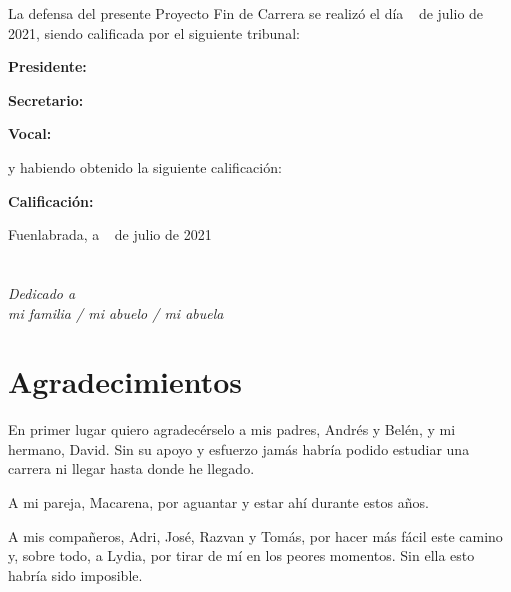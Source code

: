 \documentclass[a4paper, 12pt]{book}
\begin{document}
\vspace{1cm}
La defensa del presente Proyecto Fin de Carrera se realizó el día \qquad$\;\,$ de julio de 2021, siendo calificada por el siguiente tribunal:


\vspace{0.5cm}
\textbf{Presidente:}

\vspace{1.2cm}
\textbf{Secretario:}

\vspace{1.2cm}
\textbf{Vocal:}


\vspace{1.2cm}
y habiendo obtenido la siguiente calificación:

\vspace{1cm}
\textbf{Calificación:}


\vspace{1cm}
\begin{flushright}
Fuenlabrada, a \qquad$\;\,$ de julio de 2021
\end{flushright}


\chapter*{}
\begin{flushright}
\textit{Dedicado a \\
mi familia / mi abuelo / mi abuela}
\end{flushright}


\chapter*{Agradecimientos}
En primer lugar quiero agradecérselo a mis padres, Andrés y Belén, y mi hermano, David.
Sin su apoyo y esfuerzo jamás habría podido estudiar una carrera ni llegar hasta donde he llegado.

A mi pareja, Macarena, por aguantar y estar ahí durante estos años.

A mis compañeros, Adri, José, Razvan y Tomás, por hacer más fácil este camino y, sobre todo, a Lydia, por tirar de mí en los peores momentos.
Sin ella esto habría sido imposible.
\end{document}
